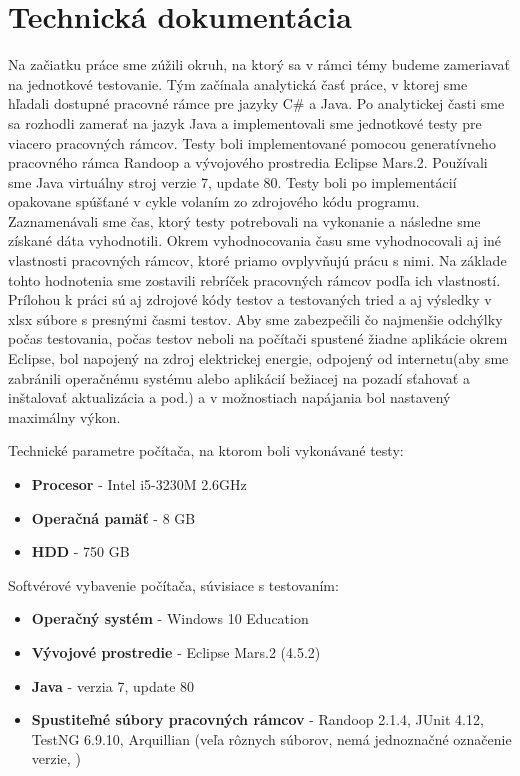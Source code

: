 \documentclass[11pt,twoside,slovak,a4paper]{article}
\begin{document}
 	\newpage
 	\section{Technická dokumentácia}
 	
 	Na začiatku práce sme zúžili okruh, na ktorý sa v rámci témy budeme zameriavať na jednotkové testovanie. Tým začínala analytická časť práce, v ktorej sme hľadali dostupné pracovné rámce pre jazyky C\# a Java. Po analytickej časti sme sa rozhodli zamerať na jazyk Java a implementovali sme jednotkové testy pre viacero pracovných rámcov. Testy boli implementované pomocou generatívneho pracovného rámca Randoop a vývojového prostredia Eclipse Mars.2. Používali sme Java virtuálny stroj verzie 7, update 80. Testy boli po implementácií opakovane spúšťané v cykle volaním zo zdrojového kódu programu. Zaznamenávali sme čas, ktorý testy potrebovali na vykonanie a následne sme získané dáta vyhodnotili. Okrem vyhodnocovania času sme vyhodnocovali aj iné vlastnosti pracovných rámcov, ktoré priamo ovplyvňujú prácu s nimi. Na základe tohto hodnotenia sme zostavili rebríček pracovných rámcov podľa ich vlastností. Prílohou k práci sú aj zdrojové kódy testov a testovaných tried a aj výsledky v xlsx súbore s presnými časmi testov. Aby sme zabezpečili čo najmenšie odchýlky počas testovania, počas testov neboli na počítači spustené žiadne aplikácie okrem Eclipse, bol napojený na zdroj elektrickej energie, odpojený od internetu(aby sme zabránili operačnému systému alebo aplikácií bežiacej na pozadí sťahovať a inštalovať aktualizácia a pod.) a v možnostiach napájania bol nastavený maximálny výkon.
 	
 	Technické parametre počítača, na ktorom boli vykonávané testy:
 	\begin{itemize}
		\item \textbf{Procesor} - Intel i5-3230M 2.6GHz
		\item \textbf{Operačná pamäť} - 8 GB
		\item \textbf{HDD} - 750 GB
	\end{itemize}
	
	Softvérové vybavenie počítača, súvisiace s testovaním:
	\begin{itemize}
		\item \textbf{Operačný systém} - Windows 10 Education
		\item \textbf{Vývojové prostredie} - Eclipse Mars.2 (4.5.2)
		\item \textbf{Java} - verzia 7, update 80
		\item \textbf{Spustiteľné súbory pracovných rámcov} - Randoop 2.1.4, JUnit 4.12, TestNG 6.9.10, Arquillian (veľa rôznych súborov, nemá jednoznačné označenie verzie, )
		
	\end{itemize}
 	
\end{document}
